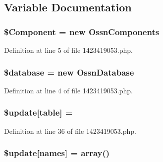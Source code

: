 \subsection{Variable Documentation}
\subsubsection[{\texorpdfstring{\$\+Component}{$Component}}]{\setlength{\rightskip}{0pt plus 5cm}\$Component = new {\bf Ossn\+Components}}\hypertarget{1423419053_8php_a02ea7567c10bfaae8b945a600a9f2de1}{}\label{1423419053_8php_a02ea7567c10bfaae8b945a600a9f2de1}


Definition at line 5 of file 1423419053.\+php.

\subsubsection[{\texorpdfstring{\$database}{$database}}]{\setlength{\rightskip}{0pt plus 5cm}\${\bf database} = new {\bf Ossn\+Database}}\hypertarget{1423419053_8php_a7691c0162d89de0b6ba47edcd8ba8878}{}\label{1423419053_8php_a7691c0162d89de0b6ba47edcd8ba8878}


Definition at line 4 of file 1423419053.\+php.

\subsubsection[{\texorpdfstring{\$update}{$update}}]{\setlength{\rightskip}{0pt plus 5cm}\${\bf update}\mbox{[}\textquotesingle{}table\textquotesingle{}\mbox{]} = \textquotesingle{}}\hypertarget{1423419053_8php_aee7ba5985ddf023a93862ab77e9718f9}{}\label{1423419053_8php_aee7ba5985ddf023a93862ab77e9718f9}


Definition at line 36 of file 1423419053.\+php.

\subsubsection[{\texorpdfstring{\$update}{$update}}]{\setlength{\rightskip}{0pt plus 5cm}\${\bf update}\mbox{[}\textquotesingle{}names\textquotesingle{}\mbox{]} = array(\textquotesingle{})}\hypertarget{1423419053_8php_abcf5ad2e4fef35de04bef0168cc91ddc}{}\label{1423419053_8php_abcf5ad2e4fef35de04bef0168cc91ddc}


